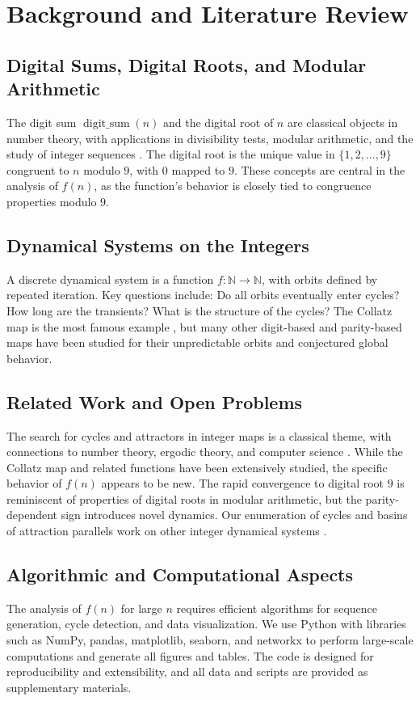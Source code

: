 \documentclass[12pt]{article}
\begin{document}
\section{Background and Literature Review}
\subsection{Digital Sums, Digital Roots, and Modular Arithmetic}
The digit sum $\operatorname{digit\_sum}(n)$ and the digital root of $n$ are classical objects in number theory, with applications in divisibility tests, modular arithmetic, and the study of integer sequences \cite{guy2004unsolved, allouche2003automatic}. The digital root is the unique value in $\{1,2,\ldots,9\}$ congruent to $n$ modulo $9$, with $0$ mapped to $9$. These concepts are central in the analysis of $f(n)$, as the function's behavior is closely tied to congruence properties modulo $9$.

\subsection{Dynamical Systems on the Integers}
A discrete dynamical system is a function $f: \mathbb{N} \to \mathbb{N}$, with orbits defined by repeated iteration. Key questions include: Do all orbits eventually enter cycles? How long are the transients? What is the structure of the cycles? The Collatz map is the most famous example \cite{lagarias2010collatz}, but many other digit-based and parity-based maps have been studied for their unpredictable orbits and conjectured global behavior.

\subsection{Related Work and Open Problems}
The search for cycles and attractors in integer maps is a classical theme, with connections to number theory, ergodic theory, and computer science \cite{sloaneOEIS, allouche2003automatic}. While the Collatz map and related functions have been extensively studied, the specific behavior of $f(n)$ appears to be new. The rapid convergence to digital root $9$ is reminiscent of properties of digital roots in modular arithmetic, but the parity-dependent sign introduces novel dynamics. Our enumeration of cycles and basins of attraction parallels work on other integer dynamical systems \cite{lagarias2010collatz, wirsching1998dynamical}.

\subsection{Algorithmic and Computational Aspects}
The analysis of $f(n)$ for large $n$ requires efficient algorithms for sequence generation, cycle detection, and data visualization. We use Python with libraries such as NumPy, pandas, matplotlib, seaborn, and networkx to perform large-scale computations and generate all figures and tables. The code is designed for reproducibility and extensibility, and all data and scripts are provided as supplementary materials.
\end{document}
